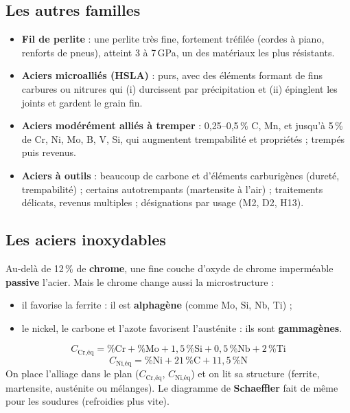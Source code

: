 
\subsection*{Les autres familles}

\begin{itemize}
  \item \textbf{Fil de perlite} : une perlite très fine, fortement tréfilée (cordes à piano,
        renforts de pneus), atteint 3 à 7\,GPa, un des matériaux les plus résistants.
  \item \textbf{Aciers microalliés (HSLA)} : purs, avec des éléments formant de fins carbures ou
        nitrures qui (i) durcissent par précipitation et (ii) épinglent les joints et gardent le
        grain fin.
  \item \textbf{Aciers modérément alliés à tremper} : 0,25--0,5\,\% C, Mn, et jusqu'à 5\,\% de
        Cr, Ni, Mo, B, V, Si, qui augmentent trempabilité et propriétés ; trempés puis revenus.
  \item \textbf{Aciers à outils} : beaucoup de carbone et d'éléments carburigènes (dureté,
        trempabilité) ; certains \og autotrempants\fg{} (martensite à l'air) ; traitements
        délicats, revenus multiples ; désignations par usage (M2, D2, H13).
\end{itemize}

\subsection*{Les aciers inoxydables}

Au-delà de 12\,\% de \textbf{chrome}, une fine couche d'oxyde de chrome imperméable
\textbf{passive} l'acier. Mais le chrome change aussi la microstructure :
\begin{itemize}
  \item il favorise la ferrite : il est \textbf{alphagène} (comme Mo, Si, Nb, Ti) ;
  \item le nickel, le carbone et l'azote favorisent l'austénite : ils sont \textbf{gammagènes}.
\end{itemize}

\begin{thmbox}[title={Chrome et nickel équivalents (diagramme de Pryce--Andrews)}]
\[ C_{\text{Cr,éq}} = \%\text{Cr} + \%\text{Mo} + 1{,}5\,\%\text{Si} + 0{,}5\,\%\text{Nb} + 2\,\%\text{Ti} \]
\[ C_{\text{Ni,éq}} = \%\text{Ni} + 21\,\%\text{C} + 11{,}5\,\%\text{N} \]
On place l'alliage dans le plan ($C_{\text{Cr,éq}}$, $C_{\text{Ni,éq}}$) et on lit sa structure
(ferrite, martensite, austénite ou mélanges). Le diagramme de \textbf{Schaeffler} fait de même
pour les soudures (refroidies plus vite).
\end{thmbox}


